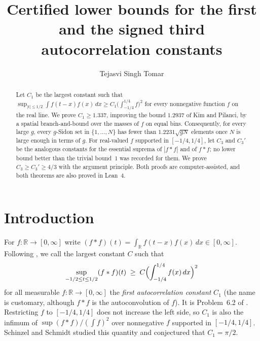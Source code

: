 \documentclass[11pt]{amsart}
\theoremstyle{definition}
\theoremstyle{remark}
\numberwithin{equation}{section}
\newcommand{\R}{\mathbb{R}}
\newcommand{\Cone}{1.337}
\newcommand{\SidonVal}{1.2231}
\newcommand{\CthrPDec}{4/3}
\begin{document}
\title[Lower bounds for autocorrelation constants]{Certified lower bounds for the first and the signed third autocorrelation constants}
\author{Tejasvi Singh Tomar}
\renewcommand{\urladdrname}{{\itshape ORCID}}

\begin{abstract}
Let $C_1$ be the largest constant such that $\sup_{|t|\le 1/2}\int f(t-x)f(x)\,dx\ge C_1\bigl(\int_{-1/4}^{1/4}f\bigr)^2$ for every nonnegative function $f$ on the real line. We prove $C_1\ge \Cone$, improving the bound $1.2937$ of Kim and Pilanci, by a spatial branch-and-bound over the masses of $f$ on equal bins. Consequently, for every large $g$, every $g$-Sidon set in $\{1,\dots,N\}$ has fewer than $\SidonVal\sqrt{gN}$ elements once $N$ is large enough in terms of $g$. For real-valued $f$ supported in $[-1/4,1/4]$, let $C_3$ and $C_3'$ be the analogous constants for the essential suprema of $|f*f|$ and of $f*f$; no lower bound better than the trivial bound~$1$ was recorded for them. We prove $C_3\ge C_3'\ge \CthrPDec$ with the argument principle. Both proofs are computer-assisted, and both theorems are also proved in Lean~4.
\end{abstract}

\maketitle

\section{Introduction}\label{sec:intro}

\enlargethispage{2pt}
For $f\colon\R\to[0,\infty]$ write $(f*f)(t)=\int_\R f(t-x)f(x)\,dx\in[0,\infty]$. Following \cite{AE25}, we call the largest constant $C$ such that
\begin{equation}\label{eq:ineq}
\sup_{-1/2\le t\le 1/2}(f*f)(t)\;\ge\;C\Bigl(\int_{-1/4}^{1/4}f(x)\,dx\Bigr)^2
\end{equation}
for all measurable $f\colon\R\to[0,\infty]$ the \emph{first autocorrelation constant} $C_1$ (the name is customary, although $f*f$ is the autoconvolution of $f$). It is Problem~6.2 of \cite{GGTW25}. Restricting $f$ to $[-1/4,1/4]$ does not increase the left side, so $C_1$ is also the infimum of $\sup(f*f)/(\int f)^2$ over nonnegative $f$ supported in $[-1/4,1/4]$. Schinzel and Schmidt \cite{SS02} studied this quantity and conjectured that $C_1=\pi/2$.
\end{document}
